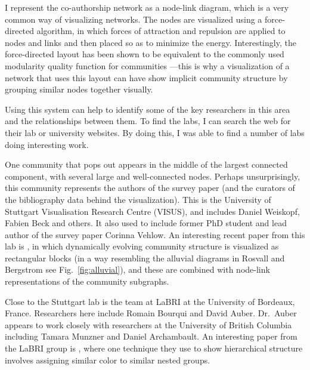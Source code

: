 I represent the co-authorship network as a node-link diagram, which is a
very common way of visualizing networks. The nodes are visualized using
a force-directed algorithm, in which forces of attraction and repulsion
are applied to nodes and links and then placed so as to minimize the
energy. Interestingly, the force-directed layout has been shown to be
equivalent to the commonly used modularity quality function for
communities ---this is why a visualization of a network that
uses this layout can have show implicit community structure by grouping
similar nodes together visually.

Using this system can help to identify some of the key researchers in
this area and the relationships between them. To find the labs, I can
search the web for their lab or university websites. By doing this, I
was able to find a number of labs doing interesting work.

One community that pops out appears in the middle of the largest
connected component, with several large and well-connected nodes.
Perhaps unsurprisingly, this community represents the authors of the
survey paper (and the curators of the bibliography data behind the
visualization). This is the University of Stuttgart Visualisation
Research Centre (VISUS), and includes Daniel Weiskopf, Fabien Beck and
others. It also used to include former PhD student and lead author of
the survey paper Corinna Vehlow. An interesting recent paper from this
lab is \autocite{vehlow_visualizing_2015}, in which dynamically evolving
community structure is visualized as rectangular blocks (in a way
resembling the alluvial diagrams in Rosvall and Bergstrom
\autocite{rosvall_mapping_2010} see Fig.~\ref{fig:alluvial}), and these
are combined with node-link representations of the community subgraphs.

Close to the Stuttgart lab is the team at LaBRI at the University of
Bordeaux, France. Researchers here include Romain Bourqui and David
Auber. Dr.~Auber appears to work closely with researchers at the
University of British Columbia including Tamara Munzner and Daniel
Archambault. An interesting paper from the LaBRI group is
\autocite{sansen_adjasankey:_2015}, where one technique they use to show
hierarchical structure involves assigning similar color to similar
nested groups.

